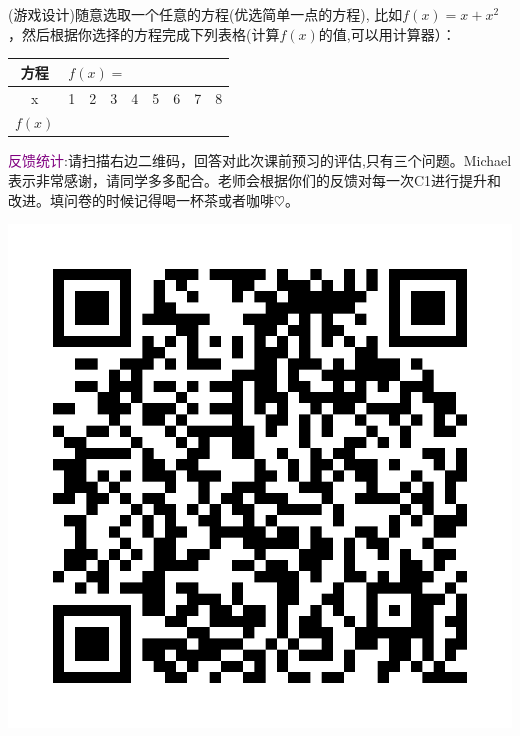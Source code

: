 \documentclass[12pt]{article}
\numberwithin{figure}{section}
\numberwithin{equation}{section}
\newenvironment{question}[2][Question]{\begin{trivlist}
\item[\hskip \labelsep {\bfseries #1}\hskip \labelsep {\bfseries #2.}]}{\end{trivlist}}
\begin{document}
\begin{question}{C1-Q5}
	(游戏设计)随意选取一个任意的方程(优选简单一点的方程), 比如$f(x) = x + x^2$，然后根据你选择的方程完成下列表格(计算$f(x)$的值,可以用计算器）：
	\begin{table}[H]
		\centering
		\begin{tabular}{|c|cccccccc|}
		\hline 
			方程 & \multicolumn{7}{l}{$f(x)=$} &  \\
			\hline 
			 x & 1 & 2 & 3 & 4 & 5 & 6 & 7 & 8 \\
			 \hline 
			 $f(x)$ & & & & & & & & \\
			 \hline 
		\end{tabular}
	\end{table}
\end{question}




\textcolor{purple}{反馈统计}:请扫描右边二维码，回答对此次课前预习的评估,只有三个问题。Michael 表示非常感谢，请同学多多配合。老师会根据你们的反馈对每一次C1进行提升和改进。填问卷的时候记得喝一杯茶或者咖啡$\heartsuit$。


\begin{marginfigure}
	\centering
	\includegraphics[width=\textwidth]{fig/C1C1qrcode}
\end{marginfigure}
\end{document}
